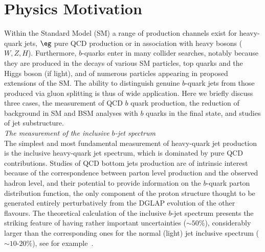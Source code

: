 \section{Physics Motivation}\label{sec:motivation}


Within the Standard Model (SM) a range of production channels exist for
heavy-quark jets, $\eg$ pure QCD production or in association with heavy bosons
($W, Z, H$). Furthermore, $b$-quarks enter in many collider searches, notably
because they are produced in the decays of various SM particles, \eg top
quarks and the Higgs boson (if light), and of numerous particles appearing
in proposed extensions of the SM. The ability to distinguish genuine $b$-quark jets from those produced via gluon splitting is thus of wide application. Here we briefly discuss three cases, the measurement of QCD $b$ quark production, the reduction of background in SM and BSM analyses with $b$ quarks in the final state, and studies of jet substructure.%
%
\\[5mm]
{\em The measurement of the inclusive $b$-jet spectrum}
\\[5mm]
The simplest and most fundamental measurement of heavy-quark jet production is
the inclusive heavy-quark jet spectrum, which is dominated by pure QCD
contributions.  Studies of QCD bottom jets production are of intrinsic interest
because of the correspondence between parton level production and the observed
hadron level, and their potential to provide information on the $b$-quark
parton distribution function, the only component of the proton structure
thought to be generated entirely perturbatively from the DGLAP evolution of the
other flavours.  The theoretical calculation of the inclusive
$b$-jet spectrum presents the striking feature of having rather important uncertainties ($\sim 50\%$), considerably larger than the
corresponding ones for the normal (light) jet inclusive spectrum ($\sim
10$-$20\%$), see for example~\cite{Frixione:1996nh}.  

